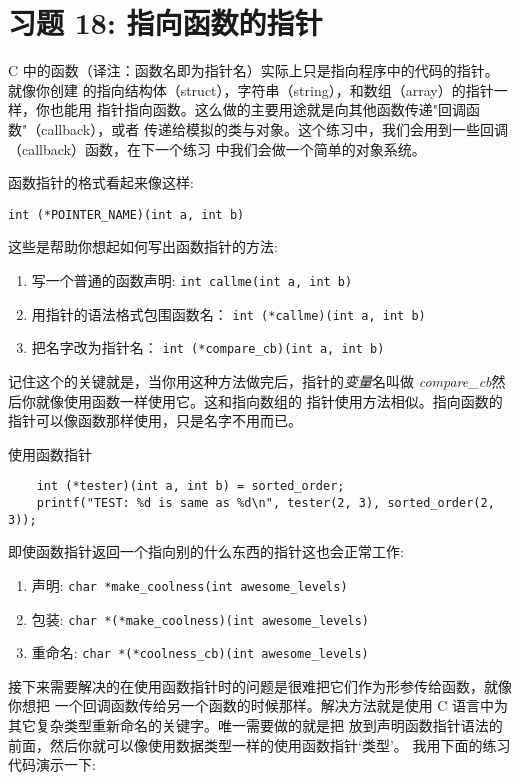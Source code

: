 \chapter{习题 18: 指向函数的指针}

C 中的函数（译注：函数名即为指针名）实际上只是指向程序中的代码的指针。就像你创建
的指向结构体（struct），字符串（string），和数组（array）的指针一样，你也能用
指针指向函数。这么做的主要用途就是向其他函数传递"回调函数"（callback），或者
传递给模拟的类与对象。这个练习中，我们会用到一些回调（callback）函数，在下一个练习
中我们会做一个简单的对象系统。

函数指针的格式看起来像这样:

\verb|int (*POINTER_NAME)(int a, int b)|

这些是帮助你想起如何写出函数指针的方法:

\begin{enumerate}
\item 写一个普通的函数声明: \verb|int callme(int a, int b)|
\item 用指针的语法格式包围函数名： \verb|int (*callme)(int a, int b)|
\item 把名字改为指针名： \verb|int (*compare_cb)(int a, int b)|
\end{enumerate}

记住这个的关键就是，当你用这种方法做完后，指针的\emph{变量}名叫做 
\emph{compare\_cb}然后你就像使用函数一样使用它。这和指向数组的
指针使用方法相似。指向函数的指针可以像函数那样使用，只是名字不用而已。

\begin{code}{使用函数指针}
\begin{lstlisting}
    int (*tester)(int a, int b) = sorted_order;
    printf("TEST: %d is same as %d\n", tester(2, 3), sorted_order(2, 3)); 
\end{lstlisting}
\end{code}

即使函数指针返回一个指向别的什么东西的指针这也会正常工作:

\begin{enumerate}
\item 声明: \verb|char *make_coolness(int awesome_levels)|
\item 包装: \verb|char *(*make_coolness)(int awesome_levels)|
\item 重命名: \verb|char *(*coolness_cb)(int awesome_levels)|
\end{enumerate}

接下来需要解决的在使用函数指针时的问题是很难把它们作为形参传给函数，就像你想把
一个回调函数传给另一个函数的时候那样。解决方法就是使用  C 
语言中为其它复杂类型重新命名的关键字。唯一需要做的就是把   
放到声明函数指针语法的前面，然后你就可以像使用数据类型一样的使用函数指针‘类型’。
我用下面的练习代码演示一下:


